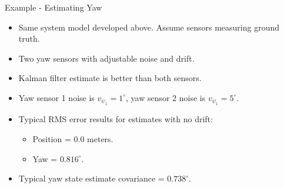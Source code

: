\documentclass[hyperref={pdfpagelabels=false}]{beamer}
\begin{document}
\begin{frame}{Example - Estimating Yaw}
\begin{itemize}
\item Same system model developed above. Assume sensors measuring ground truth.
\item Two yaw sensors with adjustable noise and drift.
\item Kalman filter estimate is better than both sensors.
\item Yaw sensor 1 noise is $v_{\psi_1} = 1^\circ$, yaw sensor 2 noise is $v_{\psi_1} = 5^\circ$.
\item Typical RMS error results for estimates with no drift:
\begin{itemize}
\item Position = $0.0$ meters.
\item Yaw = $0.816^\circ$.
\end{itemize}
\item Typical yaw state estimate covariance = $0.738^\circ$.
\end{itemize}
\end{frame}
\end{document}
